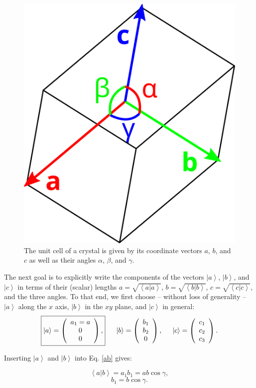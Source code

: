 \begin{figure}
	\centering
	\includegraphics[width = 0.2 \textwidth]{figures/cell}
	\caption{The unit cell of a crystal is given by its coordinate vectors $a$, $b$, and $c$ 
		as well as their angles $\alpha$, $\beta$, and $\gamma$.}
	\label{fig:cell}
\end{figure}



The next goal is to explicitly write the components of the vectors $\left| a \right>$, $\left| b \right>$, and $\left| c \right>$ in terms of their (scalar) lengths $a = \sqrt{\left< a | a \right>}$, $b = \sqrt{\left< b | b \right>}$, $c = \sqrt{\left< c | c \right>}$, and the three angles.
To that end, we first choose -- without loss of generality -- $\left| a \right>$ along the $x$ axis, $\left| b \right>$ in the $xy$ plane, and $\left| c \right>$ in general:
\begin{equation} 
	\boxed{ \left| a \right> = \left( \begin{array}{c} a_1 = a \\ 0 \\ 0 \end{array} \right), }
	\hspace{0.5cm} \left| b \right> = \left( \begin{array}{c} b_1 \\ b_2 \\ 0 \end{array} \right),
	\hspace{0.5cm} \left| c \right> = \left( \begin{array}{c} c_1 \\ c_2 \\ c_3 \end{array} \right).
\end{equation}


Inserting $\left| a \right>$ and $\left| b \right>$ into Eq. \ref{ab} gives:

\begin{equation} \left< a | b \right > = a_1 b_1 = ab \cos \gamma, \end{equation}
\begin{equation} b_1 = b \cos \gamma. \end{equation}


